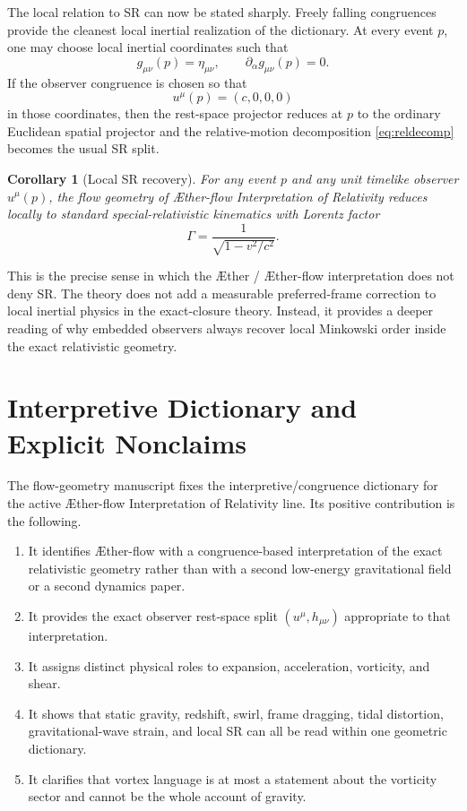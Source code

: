 \documentclass[11pt]{article}
\newcommand{\Aether}{\AE{}ther}
\newcommand{\Aflow}{\AE{}ther-flow}
\newcommand{\TheoryName}{\Aflow{} Interpretation of Relativity}
\newtheorem{corollary}{Corollary}
\begin{document}
The local relation to SR can now be stated sharply. Freely falling congruences provide the cleanest local inertial realization of the dictionary. At every event \(p\), one may choose local inertial coordinates such that
\begin{equation}
g_{\mu\nu}(p)=\eta_{\mu\nu},
\qquad
\partial_\alpha g_{\mu\nu}(p)=0.
\label{eq:localinertial}
\end{equation}
If the observer congruence is chosen so that
\begin{equation}
u^\mu(p)=(c,0,0,0)
\label{eq:localobserver}
\end{equation}
in those coordinates, then the rest-space projector reduces at \(p\) to the ordinary Euclidean spatial projector and the relative-motion decomposition \eqref{eq:reldecomp} becomes the usual SR split.

\begin{corollary}[Local SR recovery]
For any event \(p\) and any unit timelike observer \(u^\mu(p)\), the flow geometry of \TheoryName{} reduces locally to standard special-relativistic kinematics with Lorentz factor
\begin{equation}
\Gamma=\frac{1}{\sqrt{1-v^2/c^2}}.
\label{eq:localsr}
\end{equation}
\end{corollary}

This is the precise sense in which the \Aether{} / \Aflow{} interpretation does not deny SR. The theory does not add a measurable preferred-frame correction to local inertial physics in the exact-closure theory. Instead, it provides a deeper reading of why embedded observers always recover local Minkowski order inside the exact relativistic geometry.

\section{Interpretive Dictionary and Explicit Nonclaims}

The flow-geometry manuscript fixes the interpretive/congruence dictionary for the active \TheoryName{} line. Its positive contribution is the following.
\begin{enumerate}
    \item It identifies \Aflow{} with a congruence-based interpretation of the exact relativistic geometry rather than with a second low-energy gravitational field or a second dynamics paper.
    \item It provides the exact observer rest-space split \((u^\mu,h_{\mu\nu})\) appropriate to that interpretation.
    \item It assigns distinct physical roles to expansion, acceleration, vorticity, and shear.
    \item It shows that static gravity, redshift, swirl, frame dragging, tidal distortion, gravitational-wave strain, and local SR can all be read within one geometric dictionary.
    \item It clarifies that vortex language is at most a statement about the vorticity sector and cannot be the whole account of gravity.
\end{enumerate}
\end{document}
